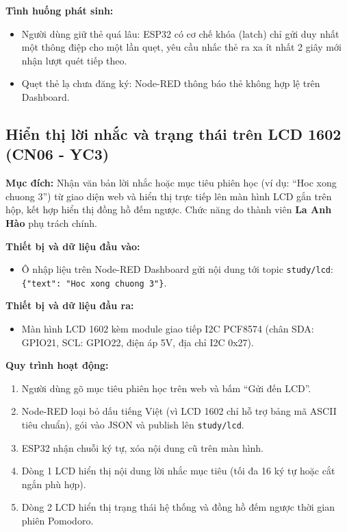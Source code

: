 \textbf{Tình huống phát sinh:}
\begin{itemize}
    \item Người dùng giữ thẻ quá lâu: ESP32 có cơ chế khóa (latch) chỉ gửi duy nhất một thông điệp cho một lần quẹt, yêu cầu nhấc thẻ ra xa ít nhất 2 giây mới nhận lượt quét tiếp theo.
    \item Quẹt thẻ lạ chưa đăng ký: Node-RED thông báo thẻ không hợp lệ trên Dashboard.
\end{itemize}

\subsection{Hiển thị lời nhắc và trạng thái trên LCD 1602 (CN06 - YC3)}
\textbf{Mục đích:}
Nhận văn bản lời nhắc hoặc mục tiêu phiên học (ví dụ: ``Hoc xong chuong 3'') từ giao diện web và hiển thị trực tiếp lên màn hình LCD gắn trên hộp, kết hợp hiển thị đồng hồ đếm ngược. Chức năng do thành viên \textbf{La Anh Hào} phụ trách chính.

\textbf{Thiết bị và dữ liệu đầu vào:}
\begin{itemize}
    \item Ô nhập liệu trên Node-RED Dashboard gửi nội dung tới topic \texttt{study/lcd}: \texttt{\{"text": "Hoc xong chuong 3"\}}.
\end{itemize}

\textbf{Thiết bị và dữ liệu đầu ra:}
\begin{itemize}
    \item Màn hình LCD 1602 kèm module giao tiếp I2C PCF8574 (chân SDA: GPIO21, SCL: GPIO22, điện áp 5V, địa chỉ I2C 0x27).
\end{itemize}

\textbf{Quy trình hoạt động:}
\begin{enumerate}
    \item Người dùng gõ mục tiêu phiên học trên web và bấm ``Gửi đến LCD''.
    \item Node-RED loại bỏ dấu tiếng Việt (vì LCD 1602 chỉ hỗ trợ bảng mã ASCII tiêu chuẩn), gói vào JSON và publish lên \texttt{study/lcd}.
    \item ESP32 nhận chuỗi ký tự, xóa nội dung cũ trên màn hình.
    \item Dòng 1 LCD hiển thị nội dung lời nhắc mục tiêu (tối đa 16 ký tự hoặc cắt ngắn phù hợp).
    \item Dòng 2 LCD hiển thị trạng thái hệ thống và đồng hồ đếm ngược thời gian phiên Pomodoro.
\end{enumerate}

